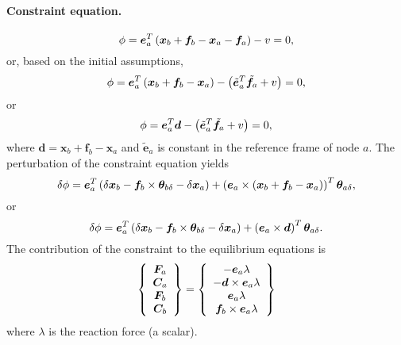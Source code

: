 \documentclass[10pt,dvips,fleqn,subeqn]{report}
\newcommand{\T}[1]{\bm{#1}}
\begin{document}
\paragraph{Constraint equation.}
\begin{equation}
	\phi = \T{e}_a^T \plbr{\T{x}_b + \T{f}_b - \T{x}_a - \T{f}_a} - v = 0 ,
\end{equation}
or, based on the initial assumptions,
\begin{equation}
	\phi = \T{e}_a^T \plbr{\T{x}_b + \T{f}_b - \T{x}_a}
		- \plbr{\tilde{\T{e}}_a^T \tilde{\T{f}}_a + v} = 0 ,
\end{equation}
or
\begin{equation}
	\phi = \T{e}_a^T \T{d}
		- \plbr{\tilde{\T{e}}_a^T \tilde{\T{f}}_a + v} = 0 ,
\end{equation}
where $\T{d}=\T{x}_b + \T{f}_b - \T{x}_a$ 
and $\tilde{\T{e}}_a$ is constant in the reference frame of node $a$.
The perturbation of the constraint equation yields
\begin{equation}
	\delta\phi = 
		\T{e}_a^T \plbr{\delta\T{x}_b
		- \T{f}_b\times\T{\theta}_{b\delta}
		- \delta\T{x}_a
		} + \plbr{\T{e}_a \times \plbr{
			\T{x}_b + \T{f}_b - \T{x}_a
		}}^T \T{\theta}_{a\delta} ,
\end{equation}
or
\begin{equation}
	\delta\phi = 
		\T{e}_a^T \plbr{\delta\T{x}_b
		- \T{f}_b\times\T{\theta}_{b\delta}
		- \delta\T{x}_a
		} + \plbr{\T{e}_a \times \T{d}}^T \T{\theta}_{a\delta} .
\end{equation}
The contribution of the constraint to the equilibrium equations is
\begin{equation}
	\cubr{\cvvect{
		\T{F}_a \\
		\T{C}_a \\
		\T{F}_b \\
		\T{C}_b
	}} = \cubr{\cvvect{
		- \T{e}_a \lambda \\
		- \T{d} \times \T{e}_a \lambda \\
		\T{e}_a \lambda \\
		\T{f}_b \times \T{e}_a \lambda
	}}
\end{equation}
where $\lambda$ is the reaction force (a scalar).
\end{document}
